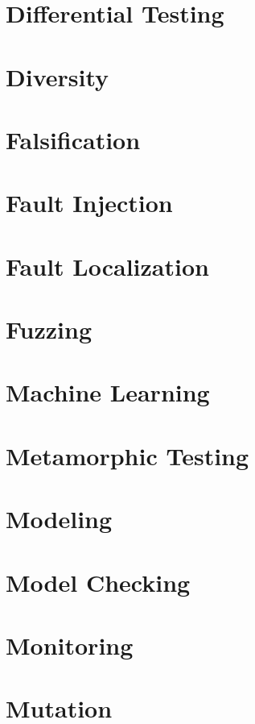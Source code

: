 \chapter{Differential Testing}

\chapter{Diversity}

\chapter{Falsification}

\chapter{Fault Injection}

\chapter{Fault Localization}

\chapter{Fuzzing}

\chapter{Machine Learning}

\chapter{Metamorphic Testing}

\chapter{Modeling}

\chapter{Model Checking}

\chapter{Monitoring}

\chapter{Mutation}

